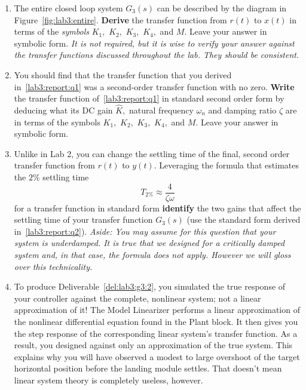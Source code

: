 \begin{deliverable}[label={lab3:report}]
  \begin{enumerate}[label={(\arabic*)}]
    \item{%
      The entire closed loop system \(G_3(s)\) can be described by the diagram in Figure~\ref{fig:lab3:entire}.
      \textbf{Derive} the transfer function from \(r(t)\) to \(x(t)\)
      in terms of the \emph{symbols} \(K_1,\) \(K_2,\) \(K_3,\) \(K_4,\) and \(M.\)
      Leave your answer in symbolic form.
      \emph{It is not required, but it is wise to verify your answer against the transfer functions discussed throughout the lab. They should be consistent.}
      \label{lab3:report:q1}
    }
    \item{%
      You should find that the transfer function that you derived in~\ref{lab3:report:q1} was a second-order transfer function with no zero.
      \textbf{Write} the transfer function of~\ref{lab3:report:q1} in standard second order form by deducing what its DC gain \(\hat{K},\) natural frequency \(\omega_n\) and damping ratio \(\zeta\) are in terms of the symbols \(K_1,\) \(K_2,\) \(K_3,\) \(K_4,\) and \(M.\)
      Leave your answer in symbolic form.
      \label{lab3:report:q2}
    }
    \item{%
      Unlike in Lab 2, you can change the settling time of the final, second order transfer function from \(r(t)\) to \(y(t).\)
      Leveraging the formula that estimates the \(2\%\) settling time
      \[
        T_{2\%} \approx \frac{4}{\zeta \omega}
      \]
      for a transfer function in standard form \textbf{identify} the two gains that affect the settling time of your transfer function \(G_3(s)\) (use the standard form derived in~\ref{lab3:report:q2}).
      \emph{Aside: You may assume for this question that your system is underdamped. It is true that we designed for a critically damped system and, in that case, the formula does not apply. However we will gloss over this technicality.}
      \label{lab3:report:q3}
    }
    \item{%
      To produce Deliverable~\ref{del:lab3:g3:2}, you simulated the true response of your controller against the complete, nonlinear system;
      not a linear approximation of it!
      The Model Linearizer performs a linear approximation of the nonlinear differential equation found in the Plant block.
      It then gives you the step response of the corresponding linear system's transfer function.
      As a result, you designed against only an approximation of the true system.
      This explains why you will have observed a modest to large overshoot of the target horizontal position before the landing module settles.
      That doesn't mean linear system theory is completely useless, however.

}
\end{enumerate}
\end{deliverable}
